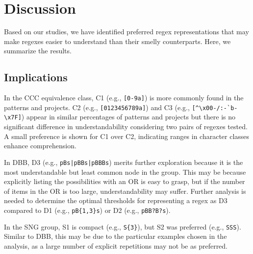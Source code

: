 \section{Discussion}
\label{sec:discussion}
Based on our studies, we have identified preferred regex representations that may make regexes easier to understand than their smelly counterparts. Here, we summarize the results.


\subsection{Implications}
In the CCC equivalence class, C1 (e.g., \verb![0-9a]!) is more commonly found in the patterns and projects.  C2 (e.g., \verb![0123456789a]!) and C3 (e.g., \verb![^\x00-/:-`b-\x7F]!) appear in similar percentages of patterns and projects but there is no significant difference in understandability considering two pairs of regexes tested. 
A small preference is shown for C1 over C2, indicating ranges in character classes enhance comprehension. 


In DBB, D3 (e.g., \verb!pBs|pBBs|pBBBs!) merits further exploration because it is the most understandable but least common node in the group.  This may be because explicitly listing the possibilities with an OR is easy to grasp, but if the number of items in the OR is too large, understandability may suffer. Further analysis is needed to determine the optimal thresholds for representing a regex as D3 compared to D1 (e.g., \verb!pB{1,3}s!) or D2 (e.g., \verb!pBB?B?s!).

In the SNG group, S1 is compact (e.g., \verb!S{3}!), but S2 was preferred (e.g., \verb!SSS!). Similar to DBB, this may be due to the particular examples chosen in the analysis, as a large number of explicit repetitions may not be as preferred.

